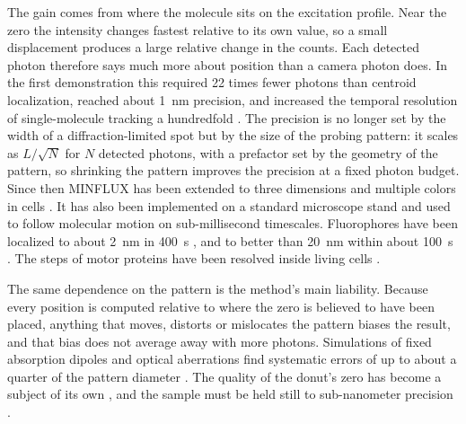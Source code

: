 \documentclass{article}
\begin{document}
The gain comes from where the molecule sits on the excitation profile. Near the zero the
intensity changes fastest relative to its own value, so a small displacement produces a large
relative change in the counts. Each detected photon therefore says much more about position than a
camera photon does. In the first demonstration this required 22 times fewer photons than centroid
localization, reached about 1~nm precision, and increased the temporal resolution of single-molecule
tracking a hundredfold \cite{balzarottiNanometerResolutionImaging2017}. The precision is no longer
set by the width of a diffraction-limited spot but by the size of the probing pattern: it scales as
$L/\sqrt{N}$ for $N$ detected photons, with a prefactor set by the geometry of the pattern, so shrinking the pattern improves the precision at a fixed
photon budget. Since then MINFLUX has been extended to three dimensions and multiple colors in
cells \cite{gwoschMINFLUXNanoscopyDelivers2020,papeMulticolor3DMINFLUX2020}. It has also been
implemented on a standard microscope stand \cite{schmidtMINFLUXNanometerscale3D2021} and used to
follow molecular motion on sub-millisecond timescales. Fluorophores have been localized to about
2~nm in 400~\textmu s \cite{eilersMINFLUXMonitorsRapid2018}, and to better than 20~nm within about
100~\textmu s \cite{schmidtMINFLUXNanometerscale3D2021}. The steps of motor proteins have been
resolved inside living cells \cite{deguchiDirectObservationMotor2023}.

The same dependence on the pattern is the method's main liability. Because every position is
computed relative to where the zero is believed to have been placed, anything that moves, distorts
or mislocates the pattern biases the result, and that bias does not average away with more photons.
Simulations of fixed absorption dipoles and optical aberrations find systematic errors of up to
about a quarter of the pattern diameter \cite{stallingaAbsorptionDipoleEffects2026}. The quality of
the donut's zero has become a subject of its own \cite{lopezOptimizationCharacterizationToroidal2023},
and the sample must be held still to sub-nanometer precision
\cite{lopezOpensourceSubNanometerStabilization2025}.
\end{document}
